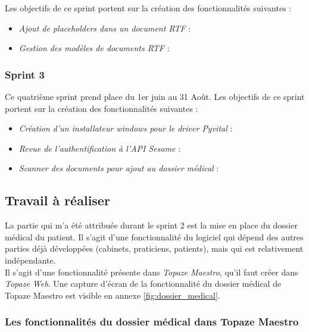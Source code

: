 
Les objectifs de ce sprint portent sur la création des fonctionnalités suivantes :
\begin{itemize}
\item \textit{Ajout de placeholders dans un document RTF} : 
\item \textit{Gestion des modèles de documents RTF} : 
\end{itemize}

\subsubsection{Sprint 3}
Ce quatrième sprint prend place du 1er juin au 31 Août.
Les objectifs de ce sprint portent sur la création des fonctionnalités suivantes :
\begin{itemize}
\item \textit{Création d'un installateur windows pour le driver Pyvital} :
\item \textit{Revue de l'authentification à l'API Sesame} :
\item \textit{Scanner des documents pour ajout au dossier médical} :
\end{itemize}

\subsection{Travail à réaliser}

La partie qui m'a été attribuée durant le sprint 2 est la mise en place du dossier médical du patient. Il s'agit d'une fonctionnalité du logiciel qui dépend des autres parties déjà développées (cabinets, praticiens, patients), mais qui est relativement indépendante. \\

Il s'agit d'une fonctionnalité présente dans \textit{Topaze Maestro}, qu'il faut créer dans \textit{Topaze Web}.
Une capture d'écran de la fonctionnalité du dossier médical de Topaze Maestro est visible en annexe \ref{fig:dossier_medical}.


\subsubsection{Les fonctionnalités du dossier médical dans Topaze Maestro}
